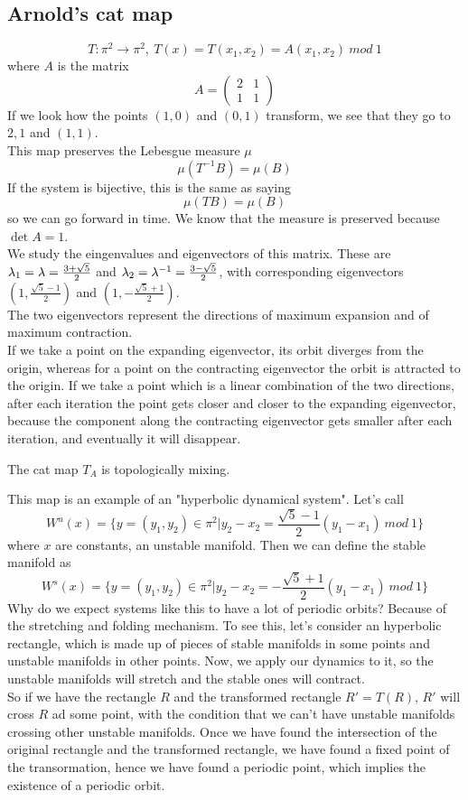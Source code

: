 \subsection{Arnold's cat map}
$$
	T : \pi^2 \rightarrow \pi^2, \ T(x) = T(x_1,x_2) = A (x_1,x_2) \ mod \ 1
$$
where $A$ is the matrix
$$
	A = \begin{pmatrix}
		2 & 1 \\
		1 & 1
	\end{pmatrix}
$$
If we look how the points $(1,0)$ and $(0,1)$ transform, we see that they go to $2,1$ and $(1,1)$. \\
This map preserves the Lebesgue measure $\mu$
$$
	\mu(T^{-1}B) = \mu(B)
$$
If the system is bijective, this is the same as saying
$$
	\mu(TB) = \mu(B)
$$
so we can go forward in time. We know that the measure is preserved because $\det A = 1$. \\
We study the eingenvalues and eigenvectors of this matrix. These are $\lambda_1 = \lambda = \frac{3+\sqrt{5}}{2}$ and $\lambda_2 = \lambda^{-1} = \frac{3-\sqrt{5}}{2}$, with corresponding eigenvectors $(1,\frac{\sqrt{5}-1}{2})$ and $(1,-\frac{\sqrt{5}+1}{2})$. \\
The two eigenvectors represent the directions of maximum expansion and of maximum contraction. \\
If we take a point on the expanding eigenvector, its orbit diverges from the origin, whereas for a point on the contracting eigenvector the orbit is attracted to the origin. If we take a point which is a linear combination of the two directions, after each iteration the point gets closer and closer to the expanding eigenvector, because the component along the contracting eigenvector gets smaller after each iteration, and eventually it will disappear.
\begin{prop}
	The cat map $T_A$ is topologically mixing.	
\end{prop}
This map is an example of an "hyperbolic dynamical system". Let's call 
$$
	W^u(x) = \{y=(y_1,y_2)\in \pi^2| y_2-x_2 = \frac{\sqrt{5}-1}{2}(y_1-x_1) \ mod \ 1\}
$$
where $x$ are constants, an unstable manifold. Then we can define the stable manifold as
$$
	W^s(x) = \{y=(y_1,y_2)\in \pi^2| y_2-x_2 = -\frac{\sqrt{5}+1}{2}(y_1-x_1) \ mod \ 1\}
$$
Why do we expect systems like this to have a lot of periodic orbits?
Because of the stretching and folding mechanism. To see this, let's consider an hyperbolic rectangle, which is made up of pieces of stable manifolds in some points and unstable manifolds in other points. Now, we apply our dynamics to it, so the unstable manifolds will stretch and the stable ones will contract. \\
So if we have the rectangle $R$ and the transformed rectangle $R'=T(R)$, $R'$ will cross $R$ ad some point, with the condition that we can't have unstable manifolds crossing other unstable manifolds. Once we have found the intersection of the original rectangle and the transformed rectangle, we have found a fixed point of the transormation, hence we have found a periodic point, which implies the existence of a periodic orbit.







